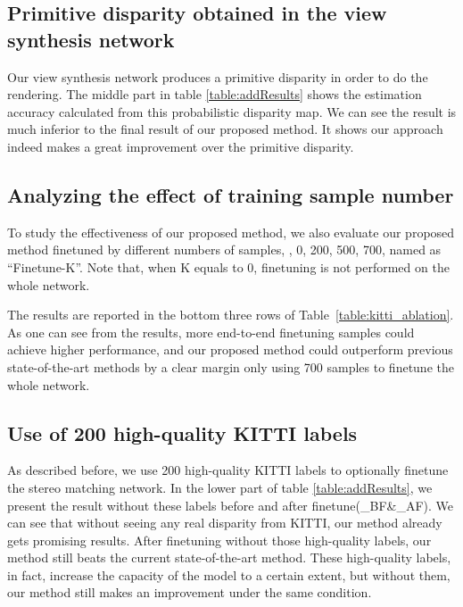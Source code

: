 \documentclass[10pt,twocolumn,letterpaper]{article}
\begin{document}
\subsection{Primitive disparity obtained in the view synthesis network} 
Our view synthesis network produces a primitive disparity in order to do the rendering. The middle part in table \ref{table:addResults} shows the estimation accuracy calculated from this probabilistic disparity map. We can see the result is much inferior to the final result of our proposed method. It shows our approach indeed makes a great improvement over the primitive disparity.


\subsection{Analyzing the effect of training sample number} 
To study the effectiveness of our proposed method, we also evaluate our proposed method finetuned by different numbers of samples, \ie, 0, 200, 500, 700, named as ``Finetune-K''. Note that, when K equals to 0, finetuning is not performed on the whole network. 

The results are reported in the bottom three rows of Table~\ref{table:kitti_ablation}. As one can see from the results, more end-to-end finetuning samples could achieve higher performance, and our proposed method could outperform previous state-of-the-art methods by a clear margin only using 700 samples to finetune the whole network. 

\subsection{Use of 200 high-quality KITTI labels} 
As described before, we use 200 high-quality KITTI labels to optionally finetune the stereo matching network. In the lower part of table \ref{table:addResults}, we present the result without these labels before and after finetune(\_BF\&\_AF). We can see that without seeing any real disparity from KITTI, our method already gets promising results. After finetuning without those high-quality labels, our method still beats the current state-of-the-art method. These high-quality labels, in fact, increase the capacity of the model to a certain extent, but without them, our method still makes an improvement under the same condition.
\end{document}
